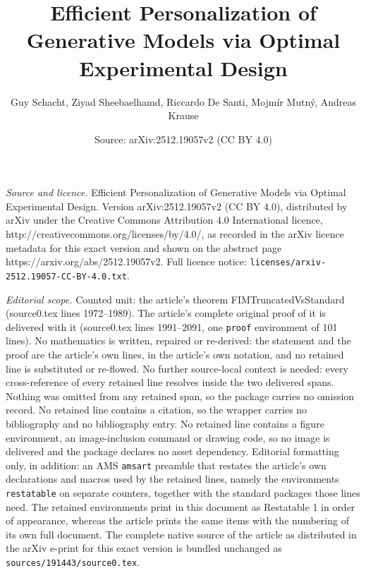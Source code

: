 \documentclass[10pt,a4paper]{amsart}
\title{Efficient Personalization of Generative Models via Optimal Experimental Design}
\author{Guy Schacht, Ziyad Sheebaelhamd, Riccardo De Santi, Mojm\'ir Mutn\'y, Andreas Krause}
\date{Source: arXiv:2512.19057v2 (CC BY 4.0)}
\begin{document}
\maketitle

\noindent\emph{Source and licence.} Efficient Personalization of Generative Models via Optimal Experimental Design. Version arXiv:2512.19057v2 (CC BY 4.0), distributed by arXiv under the Creative Commons Attribution 4.0 International licence, http://creativecommons.org/licenses/by/4.0/, as recorded in the arXiv licence metadata for this exact version and shown on the abstract page https://arxiv.org/abs/2512.19057v2. Full licence notice: \texttt{licenses/arxiv-2512.19057-CC-BY-4.0.txt}.\par\smallskip

\noindent\textit{Editorial scope.} Counted unit: the article's theorem FIMTruncatedVsStandard (source0.tex lines 1972--1989). The article's complete original proof of it is delivered with it (source0.tex lines 1991--2091, one \texttt{proof} environment of 101 lines). No mathematics is written, repaired or re-derived: the statement and the proof are the article's own lines, in the article's own notation, and no retained line is substituted or re-flowed.  No further source-local context is needed: every cross-reference of every retained line resolves inside the two delivered spans.  Nothing was omitted from any retained span, so the package carries no omission record.  No retained line contains a citation, so the wrapper carries no bibliography and no bibliography entry.  No retained line contains a figure environment, an image-inclusion command or drawing code, so no image is delivered and the package declares no asset dependency.  Editorial formatting only, in addition: an AMS \texttt{amsart} preamble that restates the article's own declarations and macros used by the retained lines, namely the environments \texttt{restatable} on separate counters, together with the standard packages those lines need.  The retained environments print in this document as Restatable 1 in order of appearance, whereas the article prints the same items with the numbering of its own full document.  The complete native source of the article as distributed in the arXiv e-print for this exact version is bundled unchanged as \texttt{sources/191443/source0.tex}.
\end{document}
